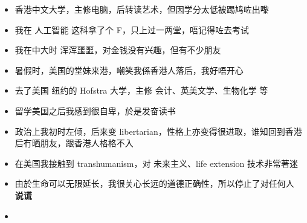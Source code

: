 \documentclass[10pt]{beamer}
\newcommand{\emp}[1]{{\color{blue}\textbf{#1}}}
\begin{document}
\begin{frame}
	\begin{itemize}
		\item 香港中文大学，主修电脑，后转读艺术，但因学分太低被踢鸠咗出嚟
		\item 我在 人工智能 这科拿了个 F，只上过一两堂，唔记得咗去考试
		\item 我在中大时 浑浑噩噩，对金钱没有兴趣，但有不少朋友
		\item 暑假时，美国的堂妹来港，嘲笑我係香港人落后，我好唔开心
		\item 去了美国 纽约的 Hofstra 大学，主修 会计、英美文学、生物化学 等
		\item 留学美国之后我感到很自卑，於是发奋读书
		\item 政治上我初时左倾，后来变 libertarian，性格上亦变得很进取，谁知回到香港后冇晒朋友，跟香港人格格不入
	\end{itemize}
\end{frame}

\begin{frame}[plain]
\fontsize{7pt}{7.2}\selectfont
	\begin{itemize}
		\item 在美国我接触到 transhumanism，对 未来主义、life extension 技术非常著迷

		\item 由於生命可以无限延长，我很关心长远的道德正确性，所以停止了对任何人 \emp{说谎}

		\item 
	\end{itemize}
\end{frame}
\end{document}
